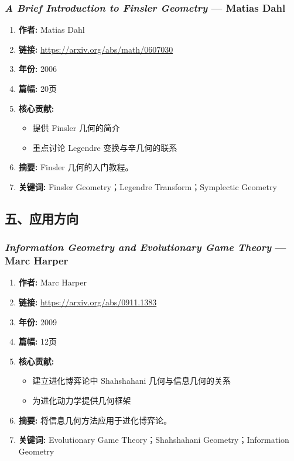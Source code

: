\subsubsection{\textbf{\textit{A Brief Introduction to Finsler Geometry}} — Matias Dahl}
\begin{enumerate}
    \item \textbf{作者:} Matias Dahl
    \item \textbf{链接:} \url{https://arxiv.org/abs/math/0607030}
    \item \textbf{年份:} 2006
    \item \textbf{篇幅:} 20页
    \item \textbf{核心贡献:}
        \begin{itemize}
            \item 提供 Finsler 几何的简介
            \item 重点讨论 Legendre 变换与辛几何的联系
        \end{itemize}
    \item \textbf{摘要:} Finsler 几何的入门教程。
    \item \textbf{关键词:} Finsler Geometry；Legendre Transform；Symplectic Geometry
\end{enumerate}

\subsection{五、应用方向}

\subsubsection{\textbf{\textit{Information Geometry and Evolutionary Game Theory}} — Marc Harper}
\begin{enumerate}
    \item \textbf{作者:} Marc Harper
    \item \textbf{链接:} \url{https://arxiv.org/abs/0911.1383}
    \item \textbf{年份:} 2009
    \item \textbf{篇幅:} 12页
    \item \textbf{核心贡献:}
        \begin{itemize}
            \item 建立进化博弈论中 Shahshahani 几何与信息几何的关系
            \item 为进化动力学提供几何框架
        \end{itemize}
    \item \textbf{摘要:} 将信息几何方法应用于进化博弈论。
    \item \textbf{关键词:} Evolutionary Game Theory；Shahshahani Geometry；Information Geometry
\end{enumerate}

